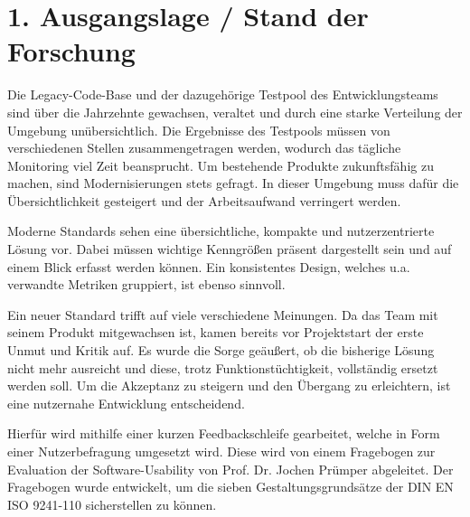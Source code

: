 \section*{1. Ausgangslage / Stand der Forschung}
Die Legacy-Code-Base und der dazugehörige Testpool des Entwicklungsteams sind über die Jahrzehnte gewachsen, veraltet und durch eine starke Verteilung der Umgebung unübersichtlich. Die Ergebnisse des Testpools müssen von verschiedenen Stellen zusammengetragen werden, wodurch das tägliche Monitoring viel Zeit beansprucht.
Um bestehende Produkte zukunftsfähig zu machen, sind Modernisierungen stets gefragt. In dieser Umgebung muss dafür die Übersichtlichkeit gesteigert und der Arbeitsaufwand verringert werden.

Moderne Standards sehen eine übersichtliche, kompakte und nutzerzentrierte Lösung vor. Dabei müssen wichtige Kenngrößen präsent dargestellt sein und auf einem Blick erfasst werden können. Ein konsistentes Design, welches u.a. verwandte Metriken gruppiert, ist ebenso sinnvoll.

Ein neuer Standard trifft auf viele verschiedene Meinungen. Da das Team mit seinem Produkt mitgewachsen ist, kamen bereits vor Projektstart der erste Unmut und Kritik auf. Es wurde die Sorge geäußert, ob die bisherige Lösung nicht mehr ausreicht und diese, trotz Funktionstüchtigkeit, vollständig ersetzt werden soll. Um die Akzeptanz zu steigern und den Übergang zu erleichtern, ist eine nutzernahe Entwicklung entscheidend.

Hierfür wird mithilfe einer kurzen Feedbackschleife gearbeitet, welche in Form einer Nutzerbefragung umgesetzt wird. Diese wird von einem Fragebogen zur Evaluation der Software-Usability von Prof. Dr. Jochen Prümper abgeleitet. Der Fragebogen wurde entwickelt, um die sieben Gestaltungsgrundsätze der DIN EN ISO 9241-110 sicherstellen zu können.
